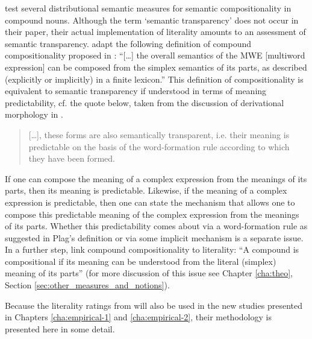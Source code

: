 \citet{Reddyetal:2011} test several distributional semantic measures
for semantic compositionality in compound nouns. Although the term `semantic
transparency' does not occur in their paper, their
actual implementation of literality amounts to an assessment of
semantic transparency. 
\citet[211]{Reddyetal:2011} adapt
the following definition of compound compositionality proposed in
\citet[66]{Bannardetal:2003}: ``[\dots] the overall semantics of the MWE
[multiword expression] can be composed from the simplex semantics of its
parts, as described (explicitly or implicitly) in a finite lexicon.''
This definition of compositionality is equivalent to semantic
transparency if understood in terms of meaning predictability, cf. the quote below, taken from
the discussion of derivational morphology in \citet{Plag:2003}.
\begin{quotation}
  [\dots], these forms are also semantically transparent, i.e. their
  meaning is predictable on the basis of the word-formation rule
  according to which they have been formed. \citep[46]{Plag:2003}
\end{quotation}
If one can compose the meaning of a complex expression from the
meanings of its parts, then its meaning is predictable. Likewise,
if the meaning of a complex expression is predictable, then one can
state the mechanism that allows one to compose this predictable meaning
of the complex expression from the meanings of its parts. 
Whether this predictability comes about via a word-formation
rule as suggested in Plag's definition or via some implicit mechanism is a
separate issue. In a further step, \citet[211]{Reddyetal:2011} link compound
compositionality to literality: ``A compound is compositional if its meaning can be understood from the literal (simplex) meaning of its
parts'' (for more discussion of this issue see Chapter \ref{cha:theo}, Section
\ref{sec:other_measures_and_notions}). 

Because the literality ratings from \citet{Reddyetal:2011} will also
be used in the new studies presented in Chapters \ref{cha:empirical-1}
and \ref{cha:empirical-2}, their
methodology is presented here in some detail.



